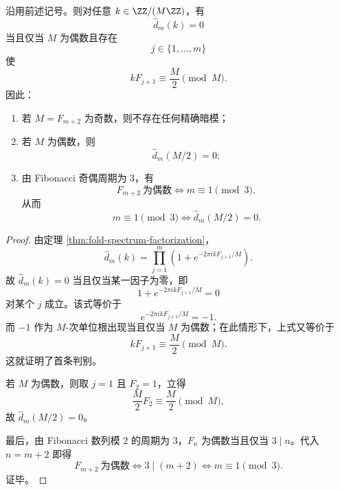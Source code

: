 \begin{theorem}\label{thm:xi-time-part60ab2-exact-dark-mode-arithmetic-criterion}
沿用前述记号。则对任意 \(k\in \ZZ/(M\ZZ)\)，有
\[
\widehat d_m(k)=0
\]
当且仅当 \(M\) 为偶数且存在
\[
j\in\{1,\dots,m\}
\]
使
\[
kF_{j+1}\equiv \frac{M}{2}\pmod M.
\]
因此：
\begin{enumerate}
  \item 若 \(M=F_{m+2}\) 为奇数，则不存在任何精确暗模；
  \item 若 \(M\) 为偶数，则
  \[
  \widehat d_m(M/2)=0;
  \]
  \item 由 Fibonacci 奇偶周期为 \(3\)，有
  \[
  F_{m+2}\ \text{为偶数}
  \iff
  m\equiv 1\pmod 3,
  \]
  从而
  \[
  m\equiv 1\pmod 3
  \iff
  \widehat d_m(M/2)=0.
  \]
\end{enumerate}
\end{theorem}
\begin{proof}
由定理 \ref{thm:fold-spectrum-factorization}，
\[
\widehat d_m(k)=\prod_{j=1}^{m}\left(1+e^{-2\pi i kF_{j+1}/M}\right).
\]
故 \(\widehat d_m(k)=0\) 当且仅当某一因子为零，即
\[
1+e^{-2\pi i kF_{j+1}/M}=0
\]
对某个 \(j\) 成立。该式等价于
\[
e^{-2\pi i kF_{j+1}/M}=-1.
\]
而 \(-1\) 作为 \(M\)-次单位根出现当且仅当 \(M\) 为偶数；在此情形下，上式又等价于
\[
kF_{j+1}\equiv \frac{M}{2}\pmod M.
\]
这就证明了首条判别。

若 \(M\) 为偶数，则取 \(j=1\) 且 \(F_2=1\)，立得
\[
\frac{M}{2}F_2\equiv \frac{M}{2}\pmod M,
\]
故 \(\widehat d_m(M/2)=0\)。

最后，由 Fibonacci 数列模 \(2\) 的周期为 \(3\)，\(F_n\) 为偶数当且仅当 \(3\mid n\)。代入 \(n=m+2\) 即得
\[
F_{m+2}\ \text{为偶数}
\iff
3\mid (m+2)
\iff
m\equiv 1\pmod 3.
\]
证毕。
\end{proof}

